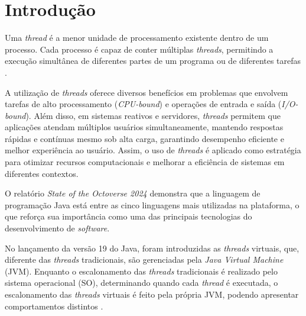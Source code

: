 \documentclass[12pt, openright, oneside, a4paper, english,	french,	spanish, brazil	]{abntex2}
\begin{document}

    \tableofcontents*
    \cleardoublepage

    \textual
    \setcounter{page}{12} 
 
    \chapter{Introdução}
    \label{chapter:introducao}
    
        Uma \textit{thread} é a menor unidade de processamento existente dentro de um processo. Cada processo é capaz de conter múltiplas \textit{threads}, permitindo a execução simultânea de diferentes partes de um programa ou de diferentes tarefas \cite{silberschatz2018}.

        A utilização de \textit{threads} oferece diversos benefícios em problemas que envolvem tarefas de alto processamento (\textit{CPU-bound}) e operações de entrada e saída (\textit{I/O-bound}). Além disso, em sistemas reativos e servidores, \textit{threads} permitem que aplicações atendam múltiplos usuários simultaneamente, mantendo respostas rápidas e contínuas mesmo sob alta carga, garantindo desempenho eficiente e melhor experiência ao usuário. Assim, o uso de \textit{threads} é aplicado como estratégia para otimizar recursos computacionais e melhorar a eficiência de sistemas em diferentes contextos.
        
        O relatório \textit{State of the Octoverse 2024} \cite{githubOctoverse2024} demonstra que a linguagem de programação Java está entre as cinco linguagens mais utilizadas na plataforma, o que reforça sua importância como uma das principais tecnologias do desenvolvimento de \textit{software}.

        No lançamento da versão 19 do Java, foram introduzidas as \textit{threads} virtuais, que, diferente das \textit{threads} tradicionais, são gerenciadas pela \textit{Java Virtual Machine} (JVM). Enquanto o escalonamento das \textit{threads} tradicionais é realizado pelo sistema operacional (SO), determinando quando cada \textit{thread} é executada, o escalonamento das \textit{threads} virtuais é feito pela própria JVM, podendo apresentar comportamentos distintos \cite{oracleVirtualThreads}. 
\end{document}
